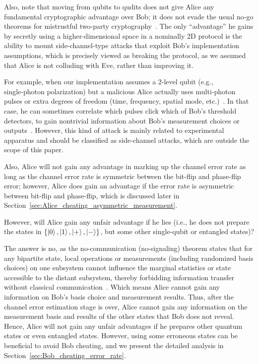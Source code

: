 \documentclass[%
 reprint,
superscriptaddress,
 amsmath,amssymb,
 aps,
]{revtex4-2}
\begin{document}
Also, note that moving from qubits to qudits does not give Alice any fundamental cryptographic advantage over Bob; it does not evade the usual no‑go theorems for mistrustful two‑party cryptography~\cite{Multiphoton_side_channel_attack1, Multiphoton_side_channel_attack2}. The only ``advantage'' he gains by secretly using a higher‑dimensional space in a nominally 2D protocol is the ability to mount side-channel-type attacks that exploit Bob’s implementation assumptions, which is precisely viewed as breaking the protocol, as we assumed that Alice is not colluding with Eve, rather than improving it.

For example, when our implementation assumes a 2-level qubit (e.g., single‑photon polarization) but a malicious Alice actually uses multi‑photon pulses or extra degrees of freedom (time, frequency, spatial mode, etc.)~\cite{Multiphoton_side_channel_attack1}. In that case, he can sometimes correlate which pulses click which of Bob’s threshold detectors, to gain nontrivial information about Bob’s measurement choices or outputs~\cite{Multiphoton_side_channel_attack1}. However, this kind of attack is mainly related to experimental apparatus and should be classified as side-channel attacks, which are outside the scope of this paper.

Also, Alice will not gain any advantage in marking up the channel error rate as long as the channel error rate is symmetric between the bit-flip and phase-flip error; however, Alice does gain an advantage if the error rate is asymmetric between bit-flip and phase-flip, which is discussed later in Section~\ref{sec:Alice_cheating_asymmetric_measurement}.

However, will Alice gain any unfair advantage if he lies (i.e., he does not prepare the states in $\{\ket{0}, \ket{1}, \ket{+}, \ket{-}\}$, but some other single-qubit or entangled states)?

The answer is no, as the no-communication (no-signaling) theorem states that for any bipartite state, local operations or measurements (including randomized basis choices) on one subsystem cannot influence the marginal statistics or state accessible to the distant subsystem, thereby forbidding information transfer without classical communication~\cite{No_signaling1, No_signaling2}. Which means Alice cannot gain any information on Bob's basis choice and measurement results. Thus, after the channel error estimation stage is over, Alice cannot gain any information on the measurement basis and results of the other states that Bob does not reveal. Hence, Alice will not gain any unfair advantages if he prepares other quantum states or even entangled states. However, using some erroneous states can be beneficial to avoid Bob cheating, and we present the detailed analysis in Section~\ref{sec:Bob_cheating_error_rate}.
\end{document}
